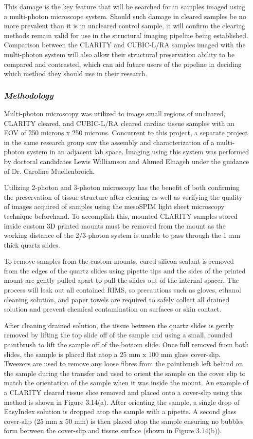 This damage is the key feature that will be searched for in samples imaged using a multi-photon microscope system. Should such damage in cleared samples be no more prevalent than it is in uncleared control sample, it will confirm the clearing methods remain valid for use in the structural imaging pipeline being established. Comparison between the CLARITY and CUBIC-L/RA samples imaged with the multi-photon system will also allow their structural preservation ability to be compared and contrasted, which can aid future users of the pipeline in deciding which method they should use in their research.

\subsubsection{\textit{Methodology}}
 Multi-photon microscopy was utilized to image small regions of uncleared, CLARITY cleared, and CUBIC-L/RA cleared cardiac tissue samples with an FOV of 250 microns x 250 microns. Concurrent to this project, a separate project in the same research group saw the assembly and characterization of a multi-photon system in an adjacent lab space. Imaging using this system was performed by doctoral candidates Lewis Williamson and Ahmed Elnageh under the guidance of Dr. Caroline Muellenbroich. 
 
 Utilizing 2-photon and 3-photon microscopy has the benefit of both confirming the preservation of tissue structure after clearing as well as verifying the quality of images acquired of samples using the mesoSPIM light sheet microscopy technique beforehand. To accomplish this, mounted CLARITY samples stored inside custom 3D printed mounts must be removed from the mount as the working distance of the 2/3-photon system is unable to pass through the 1 mm thick quartz slides.
 
 To remove samples from the custom mounts, cured silicon sealant is removed from the edges of the quartz slides using pipette tips and the sides of the printed mount are gently pulled apart to pull the slides out of the internal spacer. The process will leak out all contained RIMS, so precautions such as gloves, ethanol cleaning solution, and paper towels are required to safely collect all drained solution and prevent chemical contamination on surfaces or skin contact.

 After cleaning drained solution, the tissue between the quartz slides is gently removed by lifting the top slide off of the sample and using a small, rounded paintbrush to lift the sample off of the bottom slide. Once full removed from both slides, the sample is placed flat atop a 25 mm x 100 mm glass cover-slip. Tweezers are used to remove any loose fibres from the paintbrush left behind on the sample during the transfer and used to orient the sample on the cover slip to match the orientation of the sample when it was inside the mount. An example of a CLARITY cleared tissue slice removed and placed onto a cover-slip using this method is shown in Figure 3.14(a). After orienting the sample, a single drop of EasyIndex solution is dropped atop the sample with a pipette. A second  glass cover-slip (25 mm x 50 mm) is then placed atop the sample ensuring no bubbles form between the cover-slip and tissue surface (shown in Figure 3.14(b)). 


